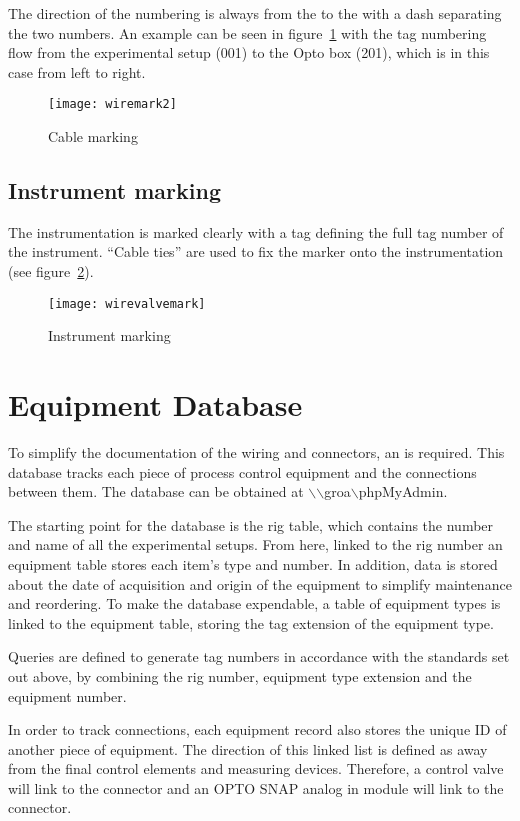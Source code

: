 The direction of the numbering is always from the  to the  with a dash separating the two numbers.  An example can be seen in figure~\ref{fig:wire:mark2} with the tag numbering flow from the experimental setup (001) to the Opto box (201), which is in this case from left to right.
\begin{figure}[htbp]
	\centering
	\texttt{[image: wiremark2]}
	\caption{Cable marking}
	\label{fig:wire:mark2}
\end{figure}

\subsection{Instrument marking}
The instrumentation is marked clearly with a tag defining the full tag number of the instrument. ``Cable ties'' are used to fix the marker onto the instrumentation (see figure~\ref{fig:wire:valvemark}).
\begin{figure}[htbp]
	\centering
	\texttt{[image: wirevalvemark]}
	\caption{Instrument marking}
	\label{fig:wire:valvemark}
\end{figure}

\section{Equipment Database}
To simplify the documentation of the wiring and connectors, an  is required. This database tracks each piece of process control equipment and the connections between them. The database can be obtained at $\backslash$$\backslash$groa$\backslash$phpMyAdmin.

The starting point for the database is the rig table, which contains the number and name of all the experimental setups.  From here, linked to the rig number an equipment table stores each item's type and number.  In addition, data is stored about the date of acquisition and origin of the equipment to simplify maintenance and reordering.  To make the database expendable, a table of equipment types is linked to the equipment table, storing the tag extension of the equipment type. 

Queries are defined to generate tag numbers in accordance with the standards set out above, by combining the rig number, equipment type extension and the equipment number.

In order to track connections, each equipment record also stores the unique ID of another piece of equipment.  The direction of this linked list is defined as away from the final control elements and measuring devices.  Therefore, a control valve will link to the  connector and an OPTO SNAP analog in module will link to the  connector.  

